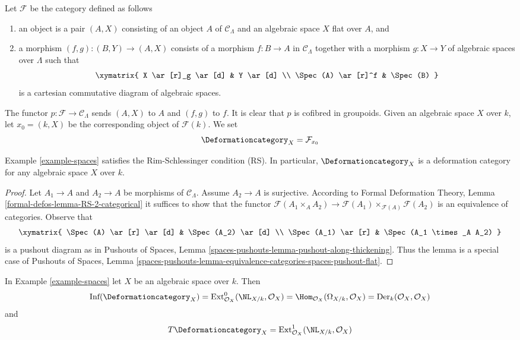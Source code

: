 \begin{example}
\label{example-spaces}
Let $\mathcal{F}$ be the category defined as follows
\begin{enumerate}
\item an object is a pair $(A, X)$ consisting of an
object $A$ of $\mathcal{C}_\Lambda$ and an algebraic space
$X$ flat over $A$, and
\item a morphism $(f, g) : (B, Y) \to (A, X)$ consists of
a morphism $f : B \to A$ in $\mathcal{C}_\Lambda$ together
with a morphism $g : X \to Y$ of algebraic spaces over $\Lambda$
such that
$$
\xymatrix{
X \ar[r]_g \ar[d] & Y \ar[d] \\
\Spec(A) \ar[r]^f & \Spec(B)
}
$$
is a cartesian commutative diagram of algebraic spaces.
\end{enumerate}
The functor $p : \mathcal{F} \to \mathcal{C}_\Lambda$ sends $(A, X)$
to $A$ and $(f, g)$ to $f$. It is clear that $p$ is cofibred in groupoids.
Given an algebraic space $X$ over $k$, let
$x_0 = (k, X)$ be the corresponding object of $\mathcal{F}(k)$. We set
$$
\Deformationcategory_X = \mathcal{F}_{x_0}
$$
\end{example}

\begin{lemma}
\label{lemma-spaces-RS}
Example \ref{example-spaces}
satisfies the Rim-Schlessinger condition (RS).
In particular, $\Deformationcategory_X$ is a deformation category
for any algebraic space $X$ over $k$.
\end{lemma}

\begin{proof}
Let $A_1 \to A$ and $A_2 \to A$ be morphisms of $\mathcal{C}_\Lambda$.
Assume $A_2 \to A$ is surjective. According to
Formal Deformation Theory, Lemma
\ref{formal-defos-lemma-RS-2-categorical}
it suffices to show that the functor
$\mathcal{F}(A_1 \times_A A_2) \to
\mathcal{F}(A_1) \times_{\mathcal{F}(A)} \mathcal{F}(A_2)$
is an equivalence of categories.
Observe that
$$
\xymatrix{
\Spec(A) \ar[r] \ar[d] & \Spec(A_2) \ar[d] \\
\Spec(A_1) \ar[r] &
\Spec(A_1 \times_A A_2)
}
$$
is a pushout diagram as in Pushouts of Spaces, Lemma
\ref{spaces-pushouts-lemma-pushout-along-thickening}.
Thus the lemma is a special case of Pushouts of Spaces, Lemma
\ref{spaces-pushouts-lemma-equivalence-categories-spaces-pushout-flat}.
\end{proof}

\begin{lemma}
\label{lemma-spaces-TI}
In Example \ref{example-spaces} let $X$ be an algebraic space over $k$. Then
$$
\text{Inf}(\Deformationcategory_X) =
\text{Ext}^0_{\mathcal{O}_X}(\NL_{X/k}, \mathcal{O}_X) =
\Hom_{\mathcal{O}_X}(\Omega_{X/k}, \mathcal{O}_X) =
\text{Der}_k(\mathcal{O}_X, \mathcal{O}_X)
$$
and
$$
T\Deformationcategory_X =
\text{Ext}^1_{\mathcal{O}_X}(\NL_{X/k}, \mathcal{O}_X)
$$
\end{lemma}


